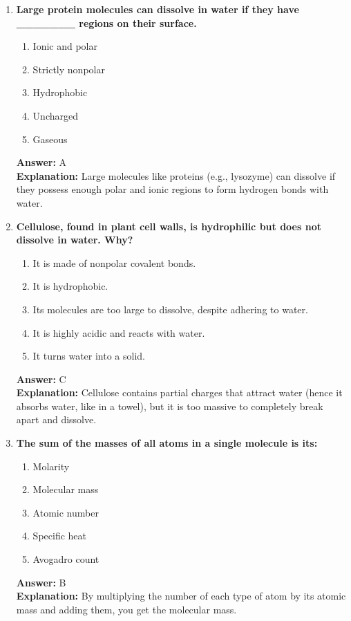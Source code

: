 \documentclass[11pt, a4paper]{article}
\begin{document}
\begin{enumerate}
\item \textbf{Large protein molecules can dissolve in water if they have \_\_\_\_\_\_\_ regions on their surface.}
\begin{enumerate}[label=\Alph*.]
    \item Ionic and polar
    \item Strictly nonpolar
    \item Hydrophobic
    \item Uncharged
    \item Gaseous
\end{enumerate}
\textbf{Answer:} A \\
\textbf{Explanation:} Large molecules like proteins (e.g., lysozyme) can dissolve if they possess enough polar and ionic regions to form hydrogen bonds with water.

\item \textbf{Cellulose, found in plant cell walls, is hydrophilic but does not dissolve in water. Why?}
\begin{enumerate}[label=\Alph*.]
    \item It is made of nonpolar covalent bonds.
    \item It is hydrophobic.
    \item Its molecules are too large to dissolve, despite adhering to water.
    \item It is highly acidic and reacts with water.
    \item It turns water into a solid.
\end{enumerate}
\textbf{Answer:} C \\
\textbf{Explanation:} Cellulose contains partial charges that attract water (hence it absorbs water, like in a towel), but it is too massive to completely break apart and dissolve.

\item \textbf{The sum of the masses of all atoms in a single molecule is its:}
\begin{enumerate}[label=\Alph*.]
    \item Molarity
    \item Molecular mass
    \item Atomic number
    \item Specific heat
    \item Avogadro count
\end{enumerate}
\textbf{Answer:} B \\
\textbf{Explanation:} By multiplying the number of each type of atom by its atomic mass and adding them, you get the molecular mass.


\end{enumerate}
\end{document}
